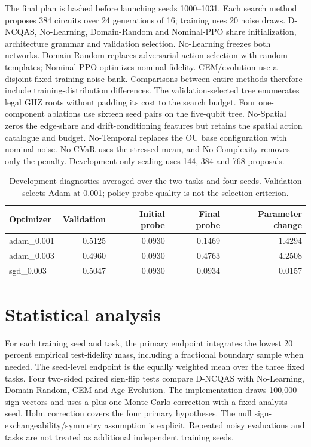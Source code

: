 \documentclass[11pt]{article}
\begin{document}
The final plan is hashed before launching seeds 1000--1031. Each search method proposes 384 circuits over 24 generations of 16; training uses 20 noise draws. D-NCQAS, No-Learning, Domain-Random and Nominal-PPO share initialization, architecture grammar and validation selection. No-Learning freezes both networks. Domain-Random replaces adversarial action selection with random templates; Nominal-PPO optimizes nominal fidelity. CEM/evolution use a disjoint fixed training noise bank. Comparisons between entire methods therefore include training-distribution differences. The validation-selected tree enumerates legal GHZ roots without padding its cost to the search budget. Four one-component ablations use sixteen seed pairs on the five-qubit tree. No-Spatial zeros the edge-share and drift-conditioning features but retains the spatial action catalogue and budget. No-Temporal replaces the OU base configuration with nominal noise. No-CVaR uses the stressed mean, and No-Complexity removes only the penalty. Development-only scaling uses 144, 384 and 768 proposals.
\begin{table}[htbp]\centering\small\caption{Development diagnostics averaged over the two tasks and four seeds. Validation selects Adam at 0.001; policy-probe quality is not the selection criterion.}\begin{tabular}{lrrrr}\toprule
Optimizer & Validation & Initial probe & Final probe & Parameter change\\\midrule
adam\_0.001 & 0.5125 & 0.0930 & 0.1469 & 1.4294\\
adam\_0.003 & 0.4960 & 0.0930 & 0.4763 & 4.2508\\
sgd\_0.003 & 0.5047 & 0.0930 & 0.0934 & 0.0157\\
\bottomrule\end{tabular}\end{table}

\section{Statistical analysis}
For each training seed and task, the primary endpoint integrates the lowest 20 percent empirical test-fidelity mass, including a fractional boundary sample when needed. The seed-level endpoint is the equally weighted mean over the three fixed tasks. Four two-sided paired sign-flip tests compare D-NCQAS with No-Learning, Domain-Random, CEM and Age-Evolution. The implementation draws 100,000 sign vectors and uses a plus-one Monte Carlo correction with a fixed analysis seed. Holm correction covers the four primary hypotheses. The null sign-exchangeability/symmetry assumption is explicit. Repeated noisy evaluations and tasks are not treated as additional independent training seeds.
\end{document}
